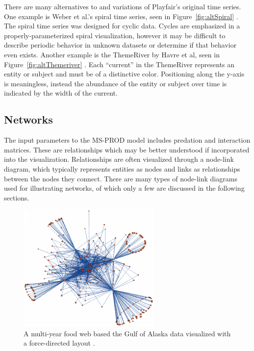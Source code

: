 There are many alternatives to and variations of Playfair's original time series.  One example is Weber et al.'s spiral time series, seen in Figure~\ref{fig:altSpiral} \cite{weber2001}.  The spiral time series was designed for cyclic data.  Cycles are emphasized in a properly-parameterized spiral visualization, however it may be difficult to describe periodic behavior in unknown datasets or determine if that behavior even exists. Another example is the ThemeRiver by Havre et al, seen in Figure~\ref{fig:altThemeriver} \cite{havre2000}.  Each ``current'' in the ThemeRiver represents an entity or subject and must be of a distinctive color.  Positioning along the y-axis is meaningless, instead the abundance of the entity or subject over time is indicated by the width of the current. 

\subsection{Networks}

The input parameters to the MS-PROD model includes predation and interaction matrices.  These are relationships which may be better understood if incorporated into the visualization. Relationships are often visualized through a node-link diagram, which typically represents entities as nodes and links as relationships between the nodes they connect.  There are many types of node-link diagrams used for illustrating networks, of which only a few are discussed in the following sections.

\begin{figure}[h]
	\centering
	\includegraphics[width=7cm]{figures/eps/gaichas.eps}
	\caption{A multi-year food web based the Gulf of Alaska data visualized with a force-directed layout \cite{gaichas2008}.}
	\label{fig:gaichas}
\end{figure}


